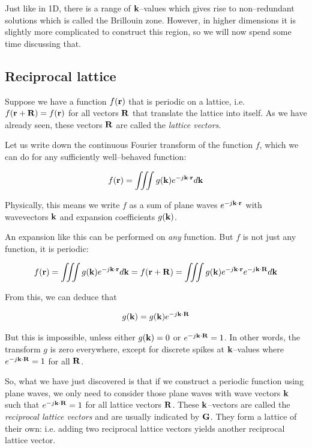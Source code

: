 Just like in 1D, there is a range of ${\bf k}$--values which gives rise to non--redundant solutions which is called the Brillouin zone. However, in higher dimensions it is slightly more complicated to construct this region, so we will now spend some time discussing that.

\subsection{Reciprocal lattice}

Suppose we have a function $f({\bf r})$ that is periodic on a lattice, i.e. $f({\bf r} + {\bf R}) = f({\bf r})$ for all vectors ${\bf R}$ that translate the lattice into itself. As we have already seen, these vectors ${\bf R}$ are called the \emph{lattice vectors}.

Let us write down the continuous Fourier transform of the function $f$, which we can do for any sufficiently well--behaved function:

\begin{equation}
f({\bf r}) = \iiint g({\bf k}) e ^ {-j {\bf k} \cdot {\bf r}} d{\bf k}
\end{equation} 

Physically, this means we write $f$ as a sum of plane waves $e ^ {-j {\bf k} \cdot {\bf r}}$ with wavevectors ${\bf k}$ and expansion coefficients $g({\bf k})$.

An expansion like this can be performed on \emph{any} function. But $f$ is not just any function, it is periodic:

\begin{equation}
f({\bf r}) = \iiint g({\bf k}) e ^ {-j {\bf k} \cdot {\bf r}} d{\bf k} = f({\bf r} + {\bf R}) = \iiint g({\bf k}) e ^ {-j {\bf k} \cdot {\bf r}} e ^ {-j {\bf k} \cdot {\bf R}} d{\bf k}
\end{equation} 

From this, we can deduce that

\begin{equation}
g({\bf k}) = g({\bf k}) e ^ {-j {\bf k} \cdot {\bf R}}
\end{equation} 

But this is impossible, unless either $g({\bf k}) = 0$ or $e ^ {-j {\bf k} \cdot {\bf R}} = 1$. In other words, the transform $g$ is zero everywhere, except for discrete spikes at ${\bf k}$--values where $e ^ {-j {\bf k} \cdot {\bf R}} = 1$ for all ${\bf R}$.

So, what we have just discovered is that if we construct a periodic function using plane waves, we only need to consider those plane waves with wave vectors ${\bf k}$ such that $e ^ {-j {\bf k} \cdot {\bf R}} = 1$ for all lattice vectors ${\bf R}$. These ${\bf k}$--vectors are called the \emph{reciprocal lattice vectors} and are usually indicated by ${\bf G}$. They form a lattice of their own: i.e. adding two reciprocal lattice vectors yields another reciprocal lattice vector.

